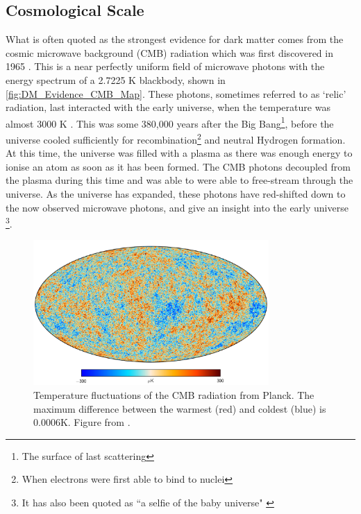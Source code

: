 \subsection{Cosmological Scale}
\par


\par
What is often quoted as the strongest evidence for dark matter comes from the cosmic microwave background (CMB) radiation which was first discovered in 1965 \cite{cmb_origins_ref}.
This is a near perfectly uniform field of microwave photons with the energy spectrum of a 2.7225 K blackbody, shown in \autoref{fig:DM_Evidence_CMB_Map}.
These photons, sometimes referred to as `relic' radiation, last interacted with the early universe, when the temperature was almost 3000 K \cite{bigbang_nucleosynthesis_ref}.
This was some 380,000 years after the Big Bang\footnote{The surface of last scattering}, before the universe cooled sufficiently for recombination\footnote{When electrons were first able to bind to nuclei} and neutral Hydrogen formation.
At this time, the universe was filled with a plasma as there was enough energy to ionise an atom as soon as it has been formed.
The CMB photons decoupled from the plasma during this time and was able to were able to free-stream through the universe.
As the universe has expanded, these photons have red-shifted down to the now observed microwave photons, and give an insight into the early universe \footnote{It has also been quoted as ``a selfie of the baby universe" \cite{marisarthurs_thesis_ref}}.

\begin{figure}[!htbp]%
    \centering
    \includegraphics[width=0.8\textwidth]{Figures/DarkMatterEvidence/cmb_radiation.png}
    \caption[Temperature fluctuations of the CMB radiation]{Temperature fluctuations of the CMB radiation from Planck.
             The maximum difference between the warmest (red) and coldest (blue) is 0.0006K.
             Figure from \cite{plank_result_ref}.}
    \label{fig:DM_Evidence_CMB_Map}
\end{figure}


